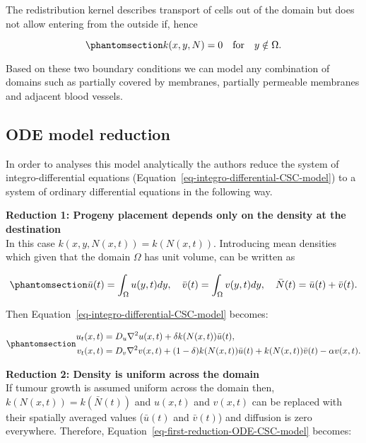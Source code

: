 \documentclass[
  letterpaper,
]{scrreprt}
\theoremstyle{definition}
\theoremstyle{remark}
\begin{document}
The redistribution kernel describes transport of cells out of the domain
but does not allow entering from the outside if, hence

\begin{equation}\phantomsection\label{eq-redistribution-kernel-dirichlet-BC}{
k(x,y,N) = 0 \quad \text{for} \quad y \notin \Omega.
}\end{equation}

Based on these two boundary conditions we can model any combination of
domains such as partially covered by membranes, partially permeable
membranes and adjacent blood vessels.

\subsection{ODE model reduction}\label{sec-ode-model-reduction}

In order to analyses this model analytically the authors reduce the
system of integro-differential equations
(Equation~\ref{eq-integro-differential-CSC-model}) to a system of
ordinary differential equations in the following way.

\textbf{Reduction 1: Progeny placement depends only on the density at
the destination}\\
In this case \(k(x,y,N(x,t)) = k(N(x,t))\). Introducing mean densities
which given that the domain \(\Omega\) has unit volume, can be written
as

\begin{equation}\phantomsection\label{eq-density-mean}{
\bar{u}(t) = \int_{\Omega} u(y,t) dy, \quad \bar{v}(t) = \int_{\Omega} v(y,t) dy, \quad \bar{N}(t) = \bar{u}(t) + \bar{v}(t).
}\end{equation}

Then Equation~\ref{eq-integro-differential-CSC-model} becomes:

\begin{equation}\phantomsection\label{eq-first-reduction-ODE-CSC-model}{
\begin{aligned}
u_t(x,t) &= D_u \nabla^2 u(x,t) + \delta   k(N(x,t))\bar{u}(t), \\
v_t(x,t) &= D_v \nabla^2 v(x,t) + (1-\delta)   k(N(x,t))\bar{u}(t) + k(N(x,t))\bar{v}(t) - \alpha v(x,t).
\end{aligned}
}\end{equation}

\textbf{Reduction 2: Density is uniform across the domain}\\
If tumour growth is assumed uniform across the domain then,
\(k(N(x,t)) = k(\bar{N}(t))\) and \(u(x,t)\) and \(v(x,t)\) can be
replaced with their spatially averaged values (\(\bar{u}(t)\) and
\(\bar{v}(t)\)) and diffusion is zero everywhere. Therefore,
Equation~\ref{eq-first-reduction-ODE-CSC-model} becomes:
\end{document}
